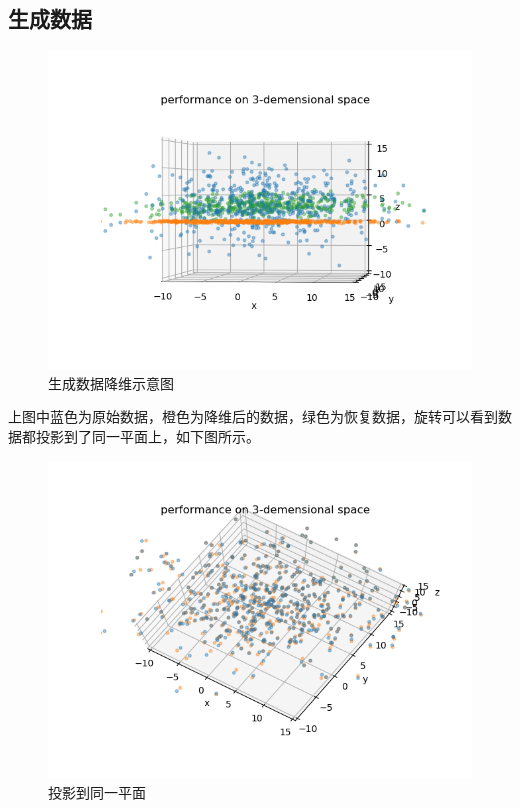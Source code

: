 \documentclass[UTF8]{ctexart}
\numberwithin{equation}{section}
\begin{document}
	\subsection{生成数据}
	
	\begin{figure}[htbp]
		\centering
		\includegraphics[scale=0.6]{Figure_1.png}
		\caption{生成数据降维示意图}
		\label{1}
	\end{figure}
	
	上图中蓝色为原始数据，橙色为降维后的数据，绿色为恢复数据，旋转可以看到数据都投影到了同一平面上，如下图所示。
	
	\begin{figure}[htbp]
		\centering
		\includegraphics[scale=0.6]{Figure_2.png}
		\caption{投影到同一平面}
		\label{2}
	\end{figure}
	
\end{document}
